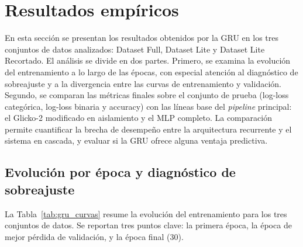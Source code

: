 
\section{Resultados emp\'iricos}
\label{sec:app_gru_resultados}

En esta secci\'on se presentan los resultados obtenidos por la GRU en los tres conjuntos de datos analizados: Dataset Full, Dataset Lite y Dataset Lite Recortado. El an\'alisis se divide en dos partes. Primero, se examina la evoluci\'on del entrenamiento a lo largo de las \'epocas, con especial atenci\'on al diagn\'ostico de sobreajuste y a la divergencia entre las curvas de entrenamiento y validaci\'on. Segundo, se comparan las m\'etricas finales sobre el conjunto de prueba (log-loss categ\'orica, log-loss binaria y accuracy) con las l\'ineas base del \textit{pipeline} principal: el Glicko-2 modificado en aislamiento y el MLP completo. La comparaci\'on permite cuantificar la brecha de desempe\~no entre la arquitectura recurrente y el sistema en cascada, y evaluar si la GRU ofrece alguna ventaja predictiva.

\subsection{Evoluci\'on por \'epoca y diagn\'ostico de sobreajuste}
\label{subsec:app_gru_curvas}

La Tabla~\ref{tab:gru_curvas} resume la evoluci\'on del entrenamiento para los tres conjuntos de datos. Se reportan tres puntos clave: la primera \'epoca, la \'epoca de mejor p\'erdida de validaci\'on, y la \'epoca final ($30$).

\begin{table}[htbp]
	\centering
	\caption{Evoluci\'on del entrenamiento GRU (modo \textit{Deep}, $T=8$). P\'erdida de entrop\'ia cruzada y \emph{accuracy}.}
	\label{tab:gru_curvas}
\end{table}


